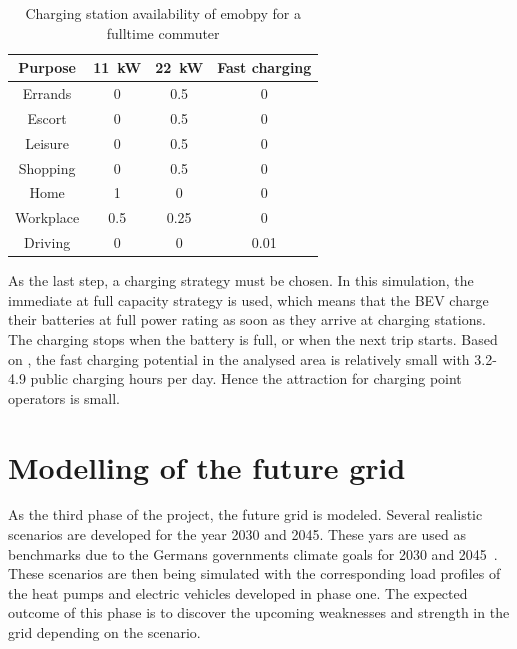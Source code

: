 \begin{table}[h]
    \centering
    \caption{Charging station availability of emobpy for a fulltime commuter}
    \begin{tabular}{|c|c|c|c|}
    \hline
        \textbf{Purpose} & \textbf{11~kW} & \textbf{22~kW} & \textbf{Fast charging} \\
        \hline
        Errands & 0 & 0.5 & 0  \\ 
        Escort & 0 & 0.5 & 0  \\
        Leisure & 0 & 0.5 & 0  \\
        Shopping & 0 & 0.5 & 0  \\
        Home & 1 & 0 & 0 \\
        Workplace & 0.5 & 0.25 & 0 \\
        Driving & 0 & 0 & 0.01 \\
        \hline
    \end{tabular}
    \label{tab:probcharg}
\end{table}

As the last step, a charging strategy must be chosen. In this simulation, the immediate at full capacity strategy is used, which means that the BEV charge their batteries at full power rating as soon as they arrive at charging stations. The charging stops when the battery is full, or when the next trip starts. Based on \cite{geospin}, the fast charging potential in the analysed area is relatively small with 3.2-4.9 public charging hours per day. Hence the attraction for charging point operators is small.  



\section{Modelling of the future grid}

As the third phase of the project, the future grid is modeled. Several realistic scenarios are developed for the year 2030 and 2045. These yars are used as benchmarks due to the Germans governments climate goals for 2030 and 2045~\cite{bmwk2022}. These scenarios are then being simulated with the corresponding load profiles of the heat pumps and electric vehicles developed in phase one. The expected outcome of this phase is to discover the upcoming weaknesses and strength in the grid depending on the scenario.

